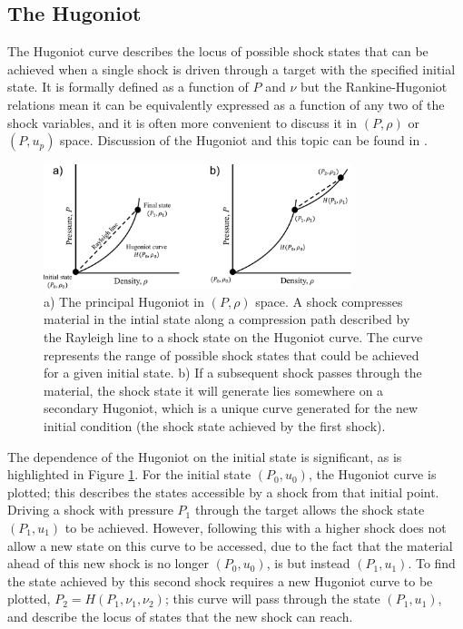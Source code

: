\subsection{The Hugoniot} \label{The Hugoniot theory}

The Hugoniot curve describes the locus of possible shock states that can be achieved when a single shock is driven through a target with the specified initial state. It is formally defined as a function of $P$ and $\nu$ but the Rankine-Hugoniot relations mean it can be equivalently expressed as a function of any two of the shock variables, and it is often more convenient to discuss it in $(P, \rho)$ or $(P, u_p)$ space. Discussion of the Hugoniot and this topic can be found in \cite{Forbes2012}.

\begin{figure}
\centering
\includegraphics[width=0.8\textwidth]{figures/Theory/SecondaryHugoniot.pdf}%
\caption{\label{fig:SecondaryHugoniot} a) The principal Hugoniot in $(P, \rho)$ space. A shock compresses material in the intial state along a compression path described by the Rayleigh line to a shock state on the Hugoniot curve. The curve represents the range of possible shock states that could be achieved for a given initial state. b) If a subsequent shock passes through the material, the shock state it will generate lies somewhere on a secondary Hugoniot, which is a unique curve generated for the new initial condition (the shock state achieved by the first shock).}
\end{figure}

The dependence of the Hugoniot on the initial state is significant, as is highlighted in Figure \ref{fig:SecondaryHugoniot}. For the initial state $(P_0, u_0)$, the Hugoniot curve is plotted; this describes the states accessible by a shock from that initial point. Driving a shock with pressure $P_1$ through the target allows the shock state $(P_1, u_1)$ to be achieved. However, following this with a higher shock does not allow a new state on this curve to be accessed, due to the fact that the material ahead of this new shock is no longer $(P_0, u_0)$, is but instead $(P_1, u_1)$. To find the state achieved by this second shock requires a new Hugoniot curve to be plotted, $P_2 = H(P_1, \nu_1, \nu_2)$; this curve will pass through the state $(P_1, u_1)$, and describe the locus of states that the new shock can reach.

